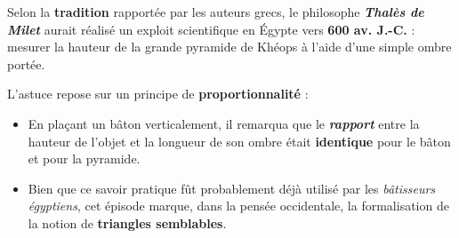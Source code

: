 \documentclass[a4paper]{book}
\begin{document}
    \begin{cultureMaths}
        Selon la \textbf{tradition} rapportée par les auteurs grecs, le philosophe \textit{\textbf{Thalès de Milet}} aurait réalisé un exploit scientifique en Égypte vers \textbf{600 av. J.-C.} : mesurer la hauteur de la grande pyramide de Khéops à l'aide d'une simple ombre portée.

        L'astuce repose sur un principe de \textbf{proportionnalité} :
        \begin{itemize}
            \item En plaçant un bâton verticalement, il remarqua que le \textit{\textbf{rapport}} entre la hauteur de l'objet et la longueur de son ombre était \textbf{identique} pour le bâton et pour la pyramide.
            \item Bien que ce savoir pratique fût probablement déjà utilisé par les \textit{bâtisseurs égyptiens}, cet épisode marque, dans la pensée occidentale, la formalisation de la notion de \textbf{triangles semblables}.
        \end{itemize}
    \end{cultureMaths}
\end{document}
